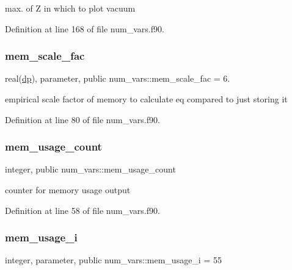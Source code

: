 max. of {\ttfamily Z} in which to plot vacuum 



Definition at line 168 of file num\+\_\+vars.\+f90.

\mbox{\label{namespacenum__vars_a37e3db17f8acca3f59bb15381848aa6e}} 
\subsubsection{\texorpdfstring{mem\+\_\+scale\+\_\+fac}{mem\_scale\_fac}}
{\footnotesize\ttfamily real(\hyperlink{namespacenum__vars_a03802aa2bd86439d7a9370836fabf3f2}{dp}), parameter, public num\+\_\+vars\+::mem\+\_\+scale\+\_\+fac = 6.}



empirical scale factor of memory to calculate eq compared to just storing it 



Definition at line 80 of file num\+\_\+vars.\+f90.

\mbox{\label{namespacenum__vars_a7f93ac44620a69373a76d591fa8507a2}} 
\subsubsection{\texorpdfstring{mem\+\_\+usage\+\_\+count}{mem\_usage\_count}}
{\footnotesize\ttfamily integer, public num\+\_\+vars\+::mem\+\_\+usage\+\_\+count}



counter for memory usage output 



Definition at line 58 of file num\+\_\+vars.\+f90.

\mbox{\label{namespacenum__vars_a606c68d407ec135c105f0501c224ea1b}} 
\subsubsection{\texorpdfstring{mem\+\_\+usage\+\_\+i}{mem\_usage\_i}}
{\footnotesize\ttfamily integer, parameter, public num\+\_\+vars\+::mem\+\_\+usage\+\_\+i = 55}



